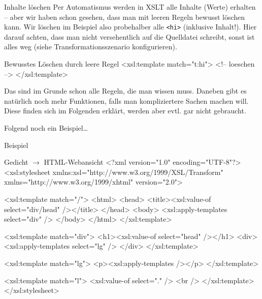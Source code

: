 \begin{frame}{Inhalte löschen}
Per Automatismus werden in XSLT alle Inhalte (Werte) erhalten -- aber wir haben schon gesehen, dass man mit leeren Regeln bewusst löschen kann. Wir löschen im Beispiel also probehalber alle \texttt{<hi>} (inklusive Inhalt!). Hier darauf achten, dass man nicht versehentlich auf die Quelldatei schreibt, sonst ist alles weg (siehe Transformationsszenario konfigurieren).

\begin{myxml}{Bewusstes Löschen durch leere Regel}
    <xsl:template match="t:hi">
        <!-- loeschen -->
    </xsl:template>
\end{myxml}
\framebreak

Das sind im Grunde schon alle Regeln, die man wissen muss. Daneben gibt es natürlich noch mehr Funktionen, falls man kompliziertere Sachen machen will. Diese finden sich im Folgenden erklärt, werden aber evtl. gar nicht gebraucht.
\medskip

Folgend noch ein Beispiel\dots 

\end{frame}

\begin{frame}{Beispiel}
\begin{myxml}{Gedicht $\to$ HTML-Webansicht}
<?xml version="1.0" encoding="UTF-8"?>
<xsl:stylesheet xmlns:xsl="http://www.w3.org/1999/XSL/Transform"
    xmlns="http://www.w3.org/1999/xhtml" version="2.0">
    
    <xsl:template match="/">
        <html>
            <head>
                <title><xsl:value-of select="div/head" /></title>
            </head>
            <body>
                <xsl:apply-templates select="div" />
            </body>
        </html>
    </xsl:template>
    
    <xsl:template match="div">
        <h1><xsl:value-of select="head" /></h1>
        <div>
            <xsl:apply-templates select="lg" />
        </div>
    </xsl:template>
    
    <xsl:template match="lg">
        <p><xsl:apply-templates /></p>    
    </xsl:template>
    
    <xsl:template match="l">
        <xsl:value-of select="." />
        <br />
    </xsl:template>
</xsl:stylesheet>
\end{myxml}
\end{frame}

